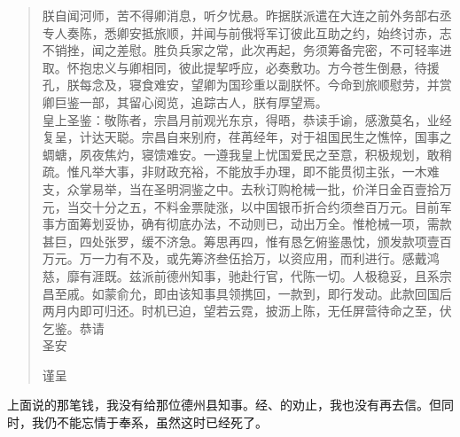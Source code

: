 \begin{quote}
	朕自闻河师，苦不得卿消息，听夕忧悬。昨据朕派遣在大连之前外务部右丞专人奏陈，悉卿安抵旅顺，并闻与前俄将军订彼此互助之约，始终讨赤，志不销挫，闻之差慰。胜负兵家之常，此次再起，务须筹备完密，不可轻率进取。怀抱忠义与卿相同，彼此提挈呼应，必奏敷功。方今苍生倒悬，待援孔，朕每念及，寝食难安，望卿为国珍重以副朕怀。今命到旅顺慰劳，并赏卿巨鉴一部，其留心阅览，追踪古人，朕有厚望焉。\\

皇上圣鉴：敬陈者，宗昌月前观光东京，得晤，恭读手谕，感激莫名，业经复呈，计达天聪。宗昌自来别府，荏苒经年，对于祖国民生之憔悴，国事之蜩螗，夙夜焦灼，寝馈难安。一遵我皇上忧国爱民之至意，积极规划，敢稍疏。惟凡举大事，非财政充裕，不能放手办理，即不能贯彻主张，一木难支，众掌易举，当在圣明洞鉴之中。去秋订购枪械一批，价洋日金百壹拾万元，当交十分之五，不料金票陡涨，以中国银币折合约须叁百万元。目前军事方面筹划妥协，确有彻底办法，不动则已，动出万全。惟枪械一项，需款甚巨，四处张罗，缓不济急。筹思再四，惟有恳乞俯鉴愚忱，颁发款项壹百万元。万一力有不及，或先筹济叁伍拾万，以资应用，而利进行。感戴鸿慈，靡有涯既。兹派前德州知事，驰赴行官，代陈一切。人极稳妥，且系宗昌至戚。如蒙俞允，即由该知事具领携回，一款到，即行发动。此款回国后两月内即可归还。时机已迫，望若云霓，披沥上陈，无任屏营待命之至，伏乞鉴。恭请\\

圣安\\

\begin{flushright}
	谨呈\\
\end{flushright}
\end{quote}

上面说的那笔钱，我没有给那位德州县知事。经、的劝止，我也没有再去信。但同时，我仍不能忘情于奉系，虽然这时已经死了。\\

